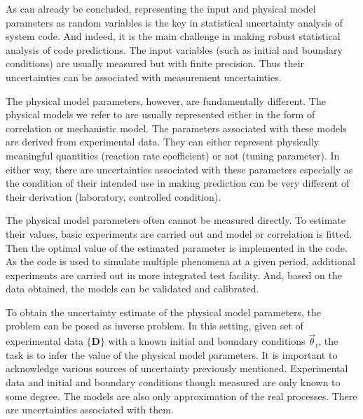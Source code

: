 \documentclass[11pt,titlepage]{article}
\begin{document}
As can already be concluded, representing the input and physical model parameters as random variables is the key in statistical uncertainty analysis of system code. 
And indeed, it is the main challenge in making robust statistical analysis of code predictions. 
The input variables (such as initial and boundary conditions) are usually measured but with finite precision.
Thus their uncertainties can be associated with measurement uncertainties. 

The physical model parameters, however, are fundamentally different. 
The physical models we refer to are usually represented either in the form of correlation or mechanistic model. 
The parameters associated with these models are derived from experimental data. 
They can either represent physically meaningful quantities (reaction rate coefficient) or not (tuning parameter). 
In either way, there are uncertainties associated with these parameters especially as the condition of their intended use in making prediction can be very different of their derivation (laboratory, controlled condition).

The physical model parameters often cannot be measured directly.
To estimate their values, basic experiments are carried out and model or correlation is fitted.
Then the optimal value of the estimated parameter is implemented in the code.
As the code is used to simulate multiple phenomena at a given period, additional experiments are carried out in more integrated test facility. And, based on the data obtained, the models can be validated and calibrated.

To obtain the uncertainty estimate of the physical model parameters, the problem can be posed as inverse problem. 
In this setting, given set of experimental data $\{\mathbf{D}\}$ with a known initial and boundary conditions $\vec{\theta}_i$, the task is to infer the value of the physical model parameters. 
It is important to acknowledge various sources of uncertainty previously mentioned. 
Experimental data and initial and boundary conditions though measured are only known to some degree.
The models are also only approximation of the real processes. 
There are uncertainties associated with them.
\end{document}
